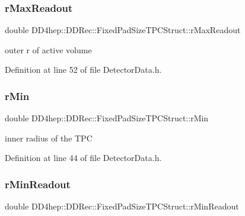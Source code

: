 \subsubsection{\texorpdfstring{r\+Max\+Readout}{rMaxReadout}}
{\footnotesize\ttfamily double D\+D4hep\+::\+D\+D\+Rec\+::\+Fixed\+Pad\+Size\+T\+P\+C\+Struct\+::r\+Max\+Readout}



outer r of active volume 



Definition at line 52 of file Detector\+Data.\+h.

\hypertarget{struct_d_d4hep_1_1_d_d_rec_1_1_fixed_pad_size_t_p_c_struct_af756bdcb676af4d4fb3b02d7fb8024a8}{}\label{struct_d_d4hep_1_1_d_d_rec_1_1_fixed_pad_size_t_p_c_struct_af756bdcb676af4d4fb3b02d7fb8024a8} 
\subsubsection{\texorpdfstring{r\+Min}{rMin}}
{\footnotesize\ttfamily double D\+D4hep\+::\+D\+D\+Rec\+::\+Fixed\+Pad\+Size\+T\+P\+C\+Struct\+::r\+Min}



inner radius of the T\+PC 



Definition at line 44 of file Detector\+Data.\+h.

\hypertarget{struct_d_d4hep_1_1_d_d_rec_1_1_fixed_pad_size_t_p_c_struct_abde215fe45dde9a8bfdbc46499d8daad}{}\label{struct_d_d4hep_1_1_d_d_rec_1_1_fixed_pad_size_t_p_c_struct_abde215fe45dde9a8bfdbc46499d8daad} 
\subsubsection{\texorpdfstring{r\+Min\+Readout}{rMinReadout}}
{\footnotesize\ttfamily double D\+D4hep\+::\+D\+D\+Rec\+::\+Fixed\+Pad\+Size\+T\+P\+C\+Struct\+::r\+Min\+Readout}



